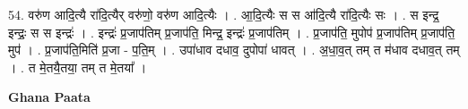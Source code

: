 \documentclass[17pt]{extarticle}
\begin{document}
54. वरु॑ण आदि॒त्यै रा॑दि॒त्यैर् वरु॑णो॒ वरु॑ण आदि॒त्यैः । . आ॒दि॒त्यैः स स आ॑दि॒त्यै रा॑दि॒त्यैः सः । . स इन्द्र॒ इन्द्रः॒ स स इन्द्रः॑ । . इन्द्रः॑ प्र॒जाप॑तिम् प्र॒जाप॑ति॒ मिन्द्र॒ इन्द्रः॑ प्र॒जाप॑तिम् । . प्र॒जाप॑ति॒ मुपोप॑ प्र॒जाप॑तिम् प्र॒जाप॑ति॒ मुप॑ । . प्र॒जाप॑ति॒मिति॑ प्र॒जा - प॒ति॒म् । . उपा॑धाव दधाव॒ दुपोपा॑ धावत् । . अ॒धा॒व॒त् तम् त म॑धाव दधाव॒त् तम् । . त मे॒तयै॒तया॒ तम् त मे॒तया᳚ । \newline

\textbf{Ghana Paata } \newline
\end{document}
